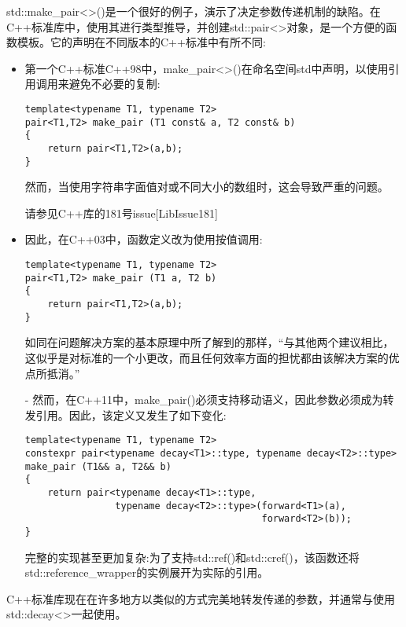 std::make\_pair<>()是一个很好的例子，演示了决定参数传递机制的缺陷。在C++标准库中，使用其进行类型推导，并创建std::pair<>对象，是一个方便的函数模板。它的声明在不同版本的C++标准中有所不同:

\begin{itemize}
\item
第一个C++标准C++98中，make\_pair<>()在命名空间std中声明，以使用引用调用来避免不必要的复制:

\begin{lstlisting}[style=styleCXX]
template<typename T1, typename T2>
pair<T1,T2> make_pair (T1 const& a, T2 const& b)
{
	return pair<T1,T2>(a,b);
}
\end{lstlisting}

然而，当使用字符串字面值对或不同大小的数组时，这会导致严重的问题。

\begin{tcolorbox}[colback=webgreen!5!white,colframe=webgreen!75!black]
\hspace*{0.75cm}请参见C++库的181号issue[LibIssue181]
\end{tcolorbox}

\item
因此，在C++03中，函数定义改为使用按值调用:

\begin{lstlisting}[style=styleCXX]
template<typename T1, typename T2>
pair<T1,T2> make_pair (T1 a, T2 b)
{
	return pair<T1,T2>(a,b);
}
\end{lstlisting}

如同在问题解决方案的基本原理中所了解到的那样，“与其他两个建议相比，这似乎是对标准的一个小更改，而且任何效率方面的担忧都由该解决方案的优点所抵消。”

\item[-]
然而，在C++11中，make\_pair()必须支持移动语义，因此参数必须成为转发引用。因此，该定义又发生了如下变化:

\begin{lstlisting}[style=styleCXX]
template<typename T1, typename T2>
constexpr pair<typename decay<T1>::type, typename decay<T2>::type>
make_pair (T1&& a, T2&& b)
{
	return pair<typename decay<T1>::type,
				typename decay<T2>::type>(forward<T1>(a),
										  forward<T2>(b));
}
\end{lstlisting}

完整的实现甚至更加复杂:为了支持std::ref()和std::cref()，该函数还将std::reference\_wrapper的实例展开为实际的引用。
\end{itemize}

C++标准库现在在许多地方以类似的方式完美地转发传递的参数，并通常与使用std::decay<>一起使用。


















